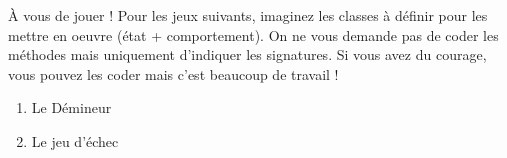 \begin{Exercice}{À vous de jouer !}
	Pour les jeux suivants, imaginez les classes à
	définir pour les mettre en oeuvre (état + comportement). On ne vous
	demande pas de coder les méthodes mais uniquement d’indiquer les
	signatures. Si vous avez du courage, vous pouvez les coder mais c’est
	beaucoup de travail !

	\begin{enumerate}[label=\alph*)]
		\item 
			Le Démineur
		\item 
			Le jeu d’échec
	\end{enumerate}
\end{Exercice}


	

	


